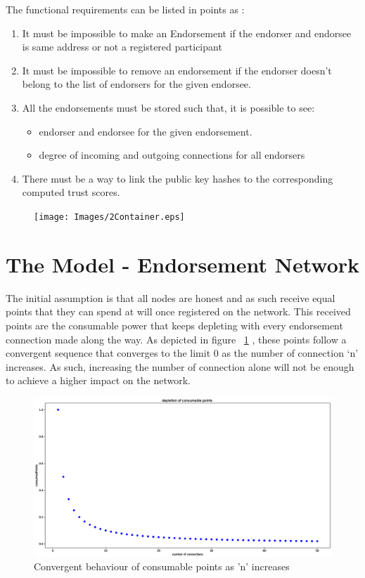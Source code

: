 The functional requirements can be listed in points as : \\
\begin{enumerate}
	\item It must be impossible to make an Endorsement if the endorser and
		endorsee is same address or not a registered participant
	\item It must be impossible to remove an endorsement if the endorser
		doesn't belong to the list of endorsers for the given endorsee.
	\item All the endorsements must be stored such that, it is possible to see: 
		\begin{itemize}
			\item endorser and endorsee for the given endorsement.
			\item degree of incoming and outgoing connections for all endorsers
		\end{itemize}
	\item There must be a way to link the public key hashes to the
		corresponding computed trust scores. 
\end{enumerate}


\begin{figure}
	\texttt{[image: Images/2Container.eps]}
\end{figure}


\section{The Model - Endorsement Network}
The initial assumption is that all nodes are honest and as such receive equal
points that they can spend at will once registered on the network. This received
points are the consumable power that keeps depleting with every endorsement
connection made along the way. As depicted in figure ~\ref{consumablePoint} ,
these points follow a convergent sequence that converges to the limit 0 as the
number of connection `n' increases. As such, increasing the number of
connection alone will not be enough to achieve a higher impact on the network.
\begin{figure}
	\centering
	\includegraphics[width=1.0\textwidth]{Images/ConsumablePoints.eps}
	\caption{Convergent behaviour of consumable points as 'n' increases}
	\label{consumablePoint}
\end{figure}


